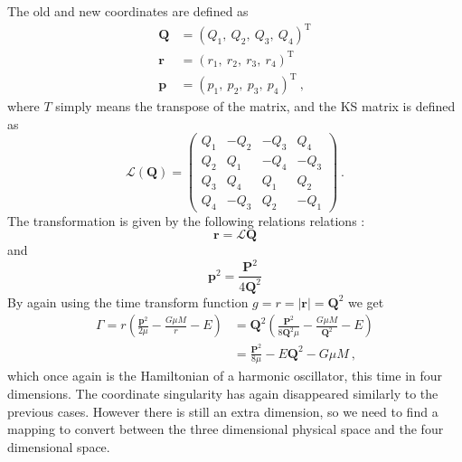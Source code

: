 \documentclass[english, oneside]{HYgradu}
\begin{document}
The old and new coordinates are defined as
\begin{align}
\mathbf{Q} &= (Q_1, \ Q_2, \ Q_3, \ Q_4)^\mathrm{T} \nonumber \\
\mathbf{r} &= (r_1, \ r_2, \ r_3, \ r_4)^\mathrm{T} \\
\mathbf{p} &= (p_1, \ p_2, \ p_3, \ p_4)^\mathrm{T}  \nonumber \ ,
\end{align}
where $T$ simply means the transpose of the matrix, and the KS matrix is defined as 
\begin{equation}
\mathcal{L}(\mathbf{Q}) =
\begin{pmatrix}
Q_1 & -Q_2 & -Q_3 & Q_4 \\
Q_2 & Q_1 & -Q_4 & -Q_3 \\
Q_3 & Q_4 & Q_1 & Q_2 \\
Q_4 & -Q_3 & Q_2 & -Q_1
\end{pmatrix} \ .
\end{equation}
The transformation is given by the following relations relations \citep{ad}: 
\begin{equation}
\mathbf{r} = \mathcal{L} \mathbf{Q} \label{equ:KStransform}
\end{equation}
and
\begin{equation}
\mathbf{p}^2 = \frac{\mathbf{P}^2}{4 \mathbf{Q}^2}
\end{equation}
By again using the time transform function $g = r = \left| \mathbf{r} \right| = \mathbf{Q}^2$ we get
\begin{align}
\Gamma = r \left( \frac{\mathbf{p}^2}{2 \mu} - \frac{G \mu M}{r} - E \right) &= \mathbf{Q}^2 \left( \frac{\mathbf{P}^2}{8 \mathbf{Q}^2 \mu} - \frac{G \mu M}{\mathbf{Q}^2} - E \right) \nonumber \\ 
&= \frac{\mathbf{P}^2}{8 \mu} - E \mathbf{Q}^2 - G \mu M \ ,
\end{align}
which once again is the Hamiltonian of a harmonic oscillator, this time in four dimensions. The coordinate singularity has again disappeared similarly to the previous cases.
However there is still an extra dimension, so we need to find a mapping to convert between the three dimensional physical space and the four dimensional space.
\end{document}
